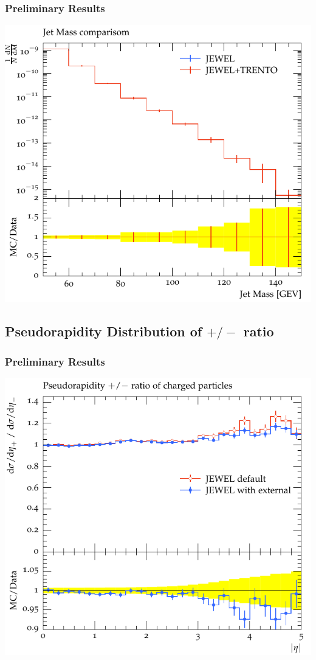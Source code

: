 \documentclass{beamer}
\begin{document}
\begin{frame}\frametitle{Preliminary Results}

        
        \begin{minipage}{1.0\textwidth}
		\includegraphics[scale=0.6]{images/Mass_4Mom_trento.pdf}        
        \end{minipage}
\end{frame}

\subsection{Pseudorapidity Distribution of $+/-$ ratio}

\begin{frame}\frametitle{Preliminary Results}

        
        \begin{minipage}{1.0\textwidth}
		\includegraphics[scale=0.6]{images/Read_EtaChPMRatio.pdf}        
        \end{minipage}
\end{frame}
\end{document}
